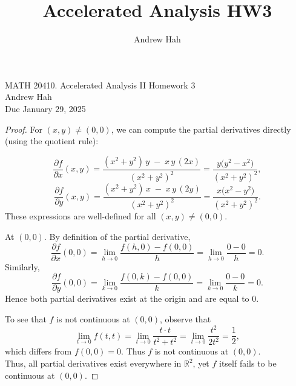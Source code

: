 \documentclass[11pt]{article}
\title{Accelerated Analysis HW3}
\author{Andrew Hah}
\begin{document}
\pagestyle{plain}
\begin{center}
{\Large MATH 20410. Accelerated Analysis II Homework 3} \\ 
\vspace{.2in}  
Andrew Hah \\
Due January 29, 2025
\end{center}

\begin{exercise}{9.6}
    \begin{proof}
        For $(x,y)\neq (0,0)$, we can compute the partial 
derivatives directly (using the quotient rule):

\[
\frac{\partial f}{\partial x}(x,y) 
= \frac{(x^2 + y^2)\,y \;-\; x\,y\,(2x)}{(x^2 + y^2)^2} 
= \frac{y\bigl(y^2 - x^2\bigr)}{(x^2 + y^2)^2},
\]
\[
\frac{\partial f}{\partial y}(x,y) 
= \frac{(x^2 + y^2)\,x \;-\; x\,y\,(2y)}{(x^2 + y^2)^2} 
= \frac{x\bigl(x^2 - y^2\bigr)}{(x^2 + y^2)^2}.
\]
These expressions are well-defined for all $(x,y)\neq (0,0)$.

At $(0,0)$. By definition of the partial derivative,
\[
\frac{\partial f}{\partial x}(0,0)
= \lim_{h \to 0} \frac{f(h,0) - f(0,0)}{h}
= \lim_{h \to 0} \frac{0 - 0}{h} 
= 0.
\]
Similarly,
\[
\frac{\partial f}{\partial y}(0,0)
= \lim_{k \to 0} \frac{f(0,k) - f(0,0)}{k}
= \lim_{k \to 0} \frac{0 - 0}{k}
= 0.
\]
Hence both partial derivatives exist at the origin and are equal to $0$.

To see that $f$ is not continuous at $(0,0)$, observe that
\[
\lim_{t \to 0} f(t,t) 
= \lim_{t \to 0} \frac{\,t \cdot t\,}{t^2 + t^2}
= \lim_{t \to 0} \frac{t^2}{2t^2}
= \frac12,
\]
which differs from $f(0,0) = 0$.  Thus $f$ is not continuous at $(0,0)$. \\

Thus, all partial derivatives exist everywhere in $\mathbb{R}^2$, 
yet $f$ itself fails to be continuous at $(0,0)$.
    \end{proof}
\end{exercise}
\end{document}

